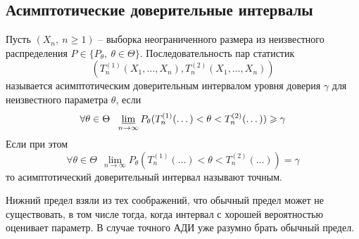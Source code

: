 \subsection{Асимптотические доверительные интервалы}

\begin{definition}
    Пусть $(X_n,\ n \ge 1)$ --  выборка неограниченного размера из неизвестного распределения $P \in \{P_\theta,\ \theta \in \Theta\}$. Последовательность пар статистик
    \[
        (T_n^{(1)}(X_1, \dots, X_n), T_n^{(2)}(X_1, \dots, X_n))
    \]
    называется асимптотическим доверительным интервалом уровня доверия $\gamma$ для неизвестного параметра $\theta$, если
    \[
        \forall \theta \in \Theta \ \ \varliminf_{n \to \infty} P_\theta(T_n^{(1)}(\dots) < \theta < T_n^{(2)}(\dots)) \ge \gamma
    \]
    Если при этом
    \[
        \forall \theta \in \Theta \ \ \lim_{n \to \infty} P_\theta(T_n^{(1)}(\dots) < \theta < T_n^{(2)}(\dots)) = \gamma
    \]
    то асимптотический доверительный интервал называют точным.
\end{definition}

\begin{note}
    Нижний предел взяли из тех соображений, что обычный предел может не существовать, в том числе тогда, когда интервал с хорошей вероятностью оценивает параметр. В случае точного АДИ уже разумно брать обычный предел.
\end{note}

